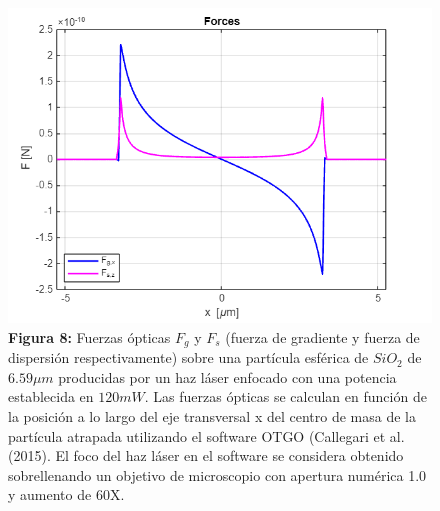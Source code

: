 \documentclass[10pt,aspectratio=1610,compress,dvipsnames]{beamer}
\begin{document}
\begin{frame}
{\begin{figure}
    \centering
    \includegraphics[scale=0.35]{Screenshot 2025-03-05 004832.png}
    \captionsetup{labelformat=empty}
    \caption{\textbf{Figura 8:} Fuerzas ópticas $F_g$ y $F_s$ (fuerza de gradiente y fuerza de dispersión respectivamente) sobre una partícula esférica de $SiO_2$ de $6.59 \mu m$ producidas por un haz láser enfocado con una potencia establecida en $120 mW$. Las fuerzas ópticas se calculan en función de la posición a lo largo del eje transversal x del centro de masa de la partícula atrapada utilizando el software OTGO (Callegari et al. (2015). El foco del haz láser en el software se considera obtenido sobrellenando un objetivo de microscopio con apertura numérica 1.0 y aumento de 60X.}
    \label{OpticalforcessetupKaren}
\end{figure} 

}


\end{frame}
\end{document}
